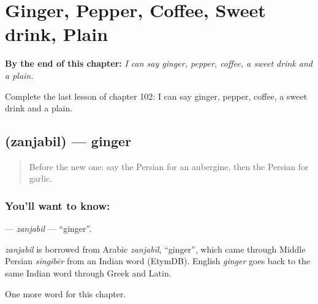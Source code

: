 
\chapter{Ginger, Pepper, Coffee, Sweet drink, Plain}
\label{ch:fa-ginger-pepper-coffee-sweet-drink-plain}

\begin{chapteropening}
\textbf{By the end of this chapter:} \emph{I can say ginger, pepper, coffee, a sweet drink and a plain.}

Complete the last lesson of chapter 102: I can say ginger, pepper, coffee, a sweet drink and a plain.
\end{chapteropening}

\section[\texorpdfstring{\fa{زنجبیل} (zanjabil)}{زنجبیل (zanjabil)}]{ (zanjabil) — ginger}

\label{lesson:FA-C102-zanjabil}



\begin{quote}
Before the new one: say the Persian for an aubergine, then the Persian for garlic.
\end{quote}

\subsection*{You'll want to know: }
\textbf{} — \emph{zanjabil} — \textquotedblleft{}ginger\textquotedblright{}.

\begin{cousinweb}
\emph{zanjabil} is borrowed from Arabic \emph{zanjabīl}, \textquotedblleft{}ginger\textquotedblright{}, which came through Middle Persian \emph{singibēr} from an Indian word (EtymDB). English \emph{ginger} goes back to the same Indian word through Greek and Latin.
\end{cousinweb}

\begin{grammarlens}[title={What you've built}]
One more word for this chapter.
\end{grammarlens}

